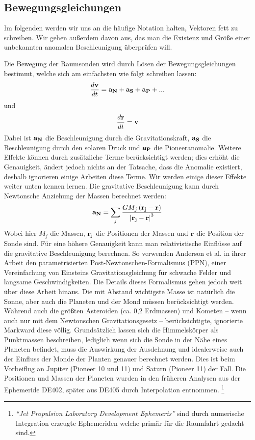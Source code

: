 
\subsection{Bewegungsgleichungen}
Im folgenden werden wir uns an die häufige Notation halten, Vektoren fett zu schreiben. Wir gehen außerdem davon aus, das man die Existenz und Größe einer unbekannten anomalen Beschleunigung überprüfen will.

Die Bewegung der Raumsonden wird durch Lösen der Bewegungsgleichungen bestimmt, welche sich am einfachsten wie folgt schreiben lassen:
\begin{equation}
\frac{d{\bf v}}{dt}={\bf a_N} + {\bf a_S} + {\bf a_P} + ...
\end{equation}
und
\begin{equation}
\frac{d{\bf r}}{dt}={\bf v}
\end{equation}
Dabei ist $\bf a_N$ die Beschleunigung durch die Gravitationskraft, $\bf a_S$ die Beschleunigung durch den solaren Druck und $\bf a_P$ die Pioneeranomalie. Weitere Effekte können durch zusätzliche Terme berücksichtigt werden; dies erhöht die Genauigkeit, ändert jedoch nichts an der Tatsache, dass die Anomalie existiert, deshalb ignorieren einige Arbeiten diese Terme. Wir werden einige dieser Effekte weiter unten kennen lernen.
Die gravitative Beschleunigung kann durch Newtonsche Anziehung der Massen berechnet werden:
\begin{equation}
{\bf a_N} = \sum_j \frac{GM_j\left({\bf r_j}-{\bf r}\right)}{\left| {\bf r_j}-{\bf r} \right|^3}
\end{equation}
Wobei hier $M_j$ die Massen, $\bf r_j$ die Positionen der Massen und $\bf r$ die Position der Sonde sind.
Für eine höhere Genauigkeit kann man relativistische Einflüsse auf die gravitative Beschleunigung berechnen. So verwenden Anderson et al. in ihrer Arbeit den parametrisierten Post-Newtonschen-Formalismus (PPN), einer Vereinfachung von Einsteins Gravitationsgleichung für schwache Felder und langsame Geschwindigkeiten.
Die Details dieses Formalismus gehen jedoch weit über diese Arbeit hinaus.
Die mit Abstand wichtigste Masse ist natürlich die Sonne, aber auch die Planeten und der Mond müssen berücksichtigt werden.
Während \cite{Anderson2002} auch die größten Asteroiden (ca. 0,2 Erdmassen) und Kometen – wenn auch nur mit dem Newtonschen Gravitationsgesetz – berücksichtigte, ignorierte Markward diese völlig.
Grundsätzlich lassen sich die Himmelskörper als Punktmassen beschreiben, lediglich wenn sich die Sonde in der Nähe eines Planeten befindet, muss die Auswirkung der Ausdehnung und idealerweise auch der Einfluss der Monde der Planten genauer berechnet werden. Dies ist beim Vorbeiflug an Jupiter (Pioneer 10 und 11) und Saturn (Pioneer 11) der Fall.
Die Positionen und Massen der Planeten wurden in den früheren Analysen aus der Ephemeride
DE402, später aus DE405 durch Interpolation entnommen.
\footnote{\textit{``Jet Propulsion Laboratory Development Ephemeris''} sind durch
numerische Integration erzeugte Ephemeriden welche primär für die Raumfahrt gedacht sind.}\cite{Anderson2002}

